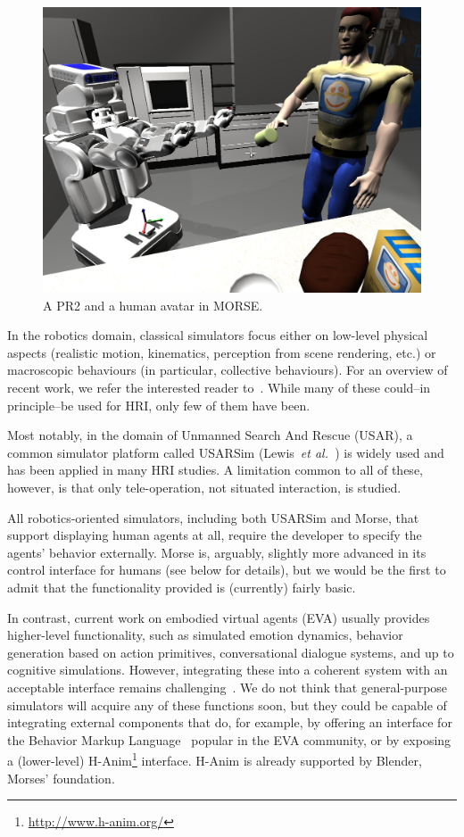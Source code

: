 \documentclass[conference]{IEEEtran}
\newcommand{\etal}{{\textit{et al.~}}}
\begin{document}
\begin{figure}[ht!]
      \centering 
      \includegraphics[width=0.9\linewidth]{morse_pr2.jpg}
      \caption{A PR2 and a human avatar in MORSE.}
      \label{fig|morse-hri}
\end{figure}

In the robotics domain, classical simulators focus either on low-level physical
aspects (realistic motion, kinematics, perception from scene rendering, etc.) 
or macroscopic behaviours (in particular, collective behaviours). For an overview
of recent work, we refer the interested reader to~\cite{Ando2010}. While many
of these could--in principle--be used for HRI, only few of them have been.

Most notably, in the domain of Unmanned Search And Rescue (USAR), a common
simulator platform called USARSim (Lewis~\etal\cite{lewis2007usarsim}) is widely
used and has been applied in many HRI studies. A limitation common to all of 
these, however, is that only tele-operation, not situated interaction, is 
studied.

All robotics-oriented simulators, including both USARSim and Morse, that
support displaying human agents at all, require the developer to specify the
agents' behavior externally. Morse is, arguably, slightly more advanced in its
control interface for humans (see below for details), but we would be the first
to admit that the functionality provided is (currently) fairly basic.

In contrast, current work on embodied virtual agents (EVA) usually provides 
higher-level functionality, such as simulated emotion dynamics, behavior 
generation based on action primitives, conversational dialogue systems, and
up to cognitive simulations. However, integrating these into a coherent 
system with an acceptable interface remains 
challenging~\cite{gratch2002creating}. We do not think that general-purpose
simulators will acquire any of these functions soon, but they could be
capable of integrating external components that do, for example, by offering 
an interface for the Behavior Markup Language~\cite{kopp2006towards} popular
in the EVA community, or by exposing a (lower-level) 
H-Anim\footnote{\url{http://www.h-anim.org/}} interface. H-Anim is already
supported by Blender, Morses' foundation.
\end{document}
